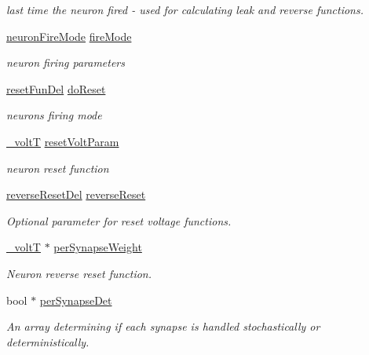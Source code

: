 \begin{DoxyCompactItemize}
\begin{DoxyCompactList}\small\item\em last time the neuron fired -\/ used for calculating leak and reverse functions. \end{DoxyCompactList}\item 
\hyperlink{neuron_8h_a48885ea6be5b55a2e24de9f97552d4ee}{neuron\+Fire\+Mode} \hyperlink{structneuron_state_a55890f9e021064df30e9d18a9df98845}{fire\+Mode}
\begin{DoxyCompactList}\small\item\em neuron firing parameters \end{DoxyCompactList}\item 
\hyperlink{neuron_8h_ae7e5990745cd949246894bfb633ca4a2}{reset\+Fun\+Del} \hyperlink{structneuron_state_afcf9d931e4fda519c43b4efeab687463}{do\+Reset}
\begin{DoxyCompactList}\small\item\em neuron\textquotesingle{}s firing mode \end{DoxyCompactList}\item 
\hyperlink{assist_8h_abe1fc1b8f9efd1187e564bcb8de7f815}{\+\_\+volt\+T} \hyperlink{structneuron_state_add87cc0b2bc3426f0fd870f7df6decd5}{reset\+Volt\+Param}
\begin{DoxyCompactList}\small\item\em neuron reset function \end{DoxyCompactList}\item 
\hyperlink{neuron_8h_aa939c0acc5b3367975f2f0cb7bc36d17}{reverse\+Reset\+Del} \hyperlink{structneuron_state_abf6970098695585c81e101b2a741b9a5}{reverse\+Reset}
\begin{DoxyCompactList}\small\item\em Optional parameter for reset voltage functions. \end{DoxyCompactList}\item 
\hyperlink{assist_8h_abe1fc1b8f9efd1187e564bcb8de7f815}{\+\_\+volt\+T} $\ast$ \hyperlink{structneuron_state_ab39656a1580505adcabc4c7a1f4d8100}{per\+Synapse\+Weight}
\begin{DoxyCompactList}\small\item\em Neuron reverse reset function. \end{DoxyCompactList}\item 
bool $\ast$ \hyperlink{structneuron_state_a95688135a244a3ce3b35698a49d0da18}{per\+Synapse\+Det}
\begin{DoxyCompactList}\small\item\em An array determining if each synapse is handled stochastically or deterministically. \end{DoxyCompactList}\item 

\end{DoxyCompactItemize}
